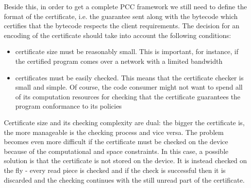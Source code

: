 Beside this, in order to get a complete PCC framework we still need to define the
format of the certificate, i.e. 
the guarantee sent along with the bytecode which certifies that the bytecode 
respects the client requirements. The decision for an encoding of the
certificate should take into account  the following conditions:
\begin{itemize} 
  \item certificate size must be reasonably small. This is important, for
    instance,  if the certified program comes over a network 
    with a limited bandwidth
  \item certificates must be easily checked. This means that the certificate checker is  small and simple.
               Of course, the code consumer might not want to spend all of its computation 
              resources for checking that the certificate guarantees the
               program conformance to its policies   
\end{itemize}

Certificate size and its checking complexity are dual: the
bigger the certificate is, the more manageable is the checking 
process and vice versa.  The problem becomes even more difficult if the
certificate must be checked on the device because 
of the computational and space constraints. In this case, a possible solution
is that the certificate is not stored on the device. It is instead checked on
the fly - every read piece is checked  and if the check is successful then 
it is discarded and the checking continues with the still unread part of the certificate.
  
%  
% 
%        
%     


